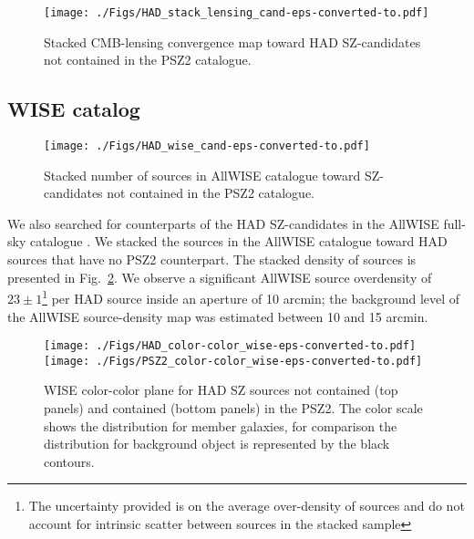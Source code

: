 \documentclass[traditabstract,a4,twocolumn]{aa}
\begin{document}
\begin{figure}[!th]
\begin{center}
\texttt{[image: ./Figs/HAD\_stack\_lensing\_cand-eps-converted-to.pdf]}
\caption{Stacked CMB-lensing convergence map toward HAD SZ-candidates not contained in the PSZ2 catalogue.}
\label{stacklens}
\end{center}
\end{figure}

\subsection{WISE catalog}

\begin{figure}[!th]
\begin{center}
\texttt{[image: ./Figs/HAD\_wise\_cand-eps-converted-to.pdf]}
\caption{Stacked number of sources in AllWISE catalogue toward SZ-candidates not contained in the PSZ2 catalogue.}
\label{stackwise}
\end{center}
\end{figure}

We also searched for counterparts of the HAD SZ-candidates in the AllWISE
full-sky catalogue \citep{cut13}.  We stacked the sources in the
AllWISE catalogue toward HAD sources that have no PSZ2
counterpart.  The stacked density of sources is presented in
Fig.~\ref{stackwise}. We observe a significant AllWISE source overdensity of $23 \pm 1$\footnote{The uncertainty provided is on the average over-density of sources and do not account for intrinsic scatter between sources in the stacked sample} per HAD source inside an aperture of 10
arcmin; the background level of the AllWISE source-density map was estimated between 10 and 15 arcmin.


\begin{figure}[!th]
\begin{center}
\texttt{[image: ./Figs/HAD\_color-color\_wise-eps-converted-to.pdf]}
\texttt{[image: ./Figs/PSZ2\_color-color\_wise-eps-converted-to.pdf]}
\caption{WISE color-color plane for HAD SZ sources not contained (top panels) and contained (bottom panels) in the PSZ2. The color scale shows the distribution for member galaxies, for comparison the distribution for background object is represented by the black contours.}
\label{wcch}
\end{center}
\end{figure}
\end{document}
